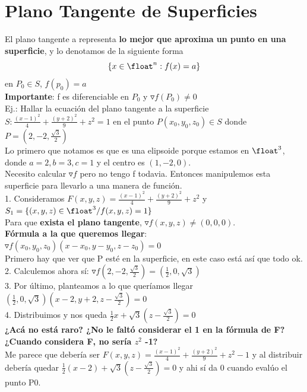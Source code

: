 \documentclass[10pt,a4paper]{article}
\begin{document}
\section*{Plano Tangente de Superficies}
El plano tangente a representa \textbf{lo mejor que aproxima un punto en una superficie}, y lo denotamos de la siguiente forma 
\[\{x \in \float^{n}:f(x) = a\}\]
en $P_{0} \in S$, $f(p_{0})=a$ \\
\textbf{Importante}: f es diferenciable en $P_{0}$ y $\triangledown f(P_{0}) \neq 0$ \\
Ej.: Hallar la ecuación del plano tangente a la superficie $S: \frac{(x-1)^{2}}{4} + \frac{(y+2)^{2}}{9} + z^{2} = 1$ en el punto $P(x_{0}, y_{0}, z_{0}) \in S$ donde $P=(2, -2, \frac{\sqrt{3}}{2})$ \\
Lo primero que notamos es que es una elipsoide porque estamos en $\float^{3}$, donde $ a = 2, b = 3, c = 1$ y el centro es $(1, -2, 0)$. \\
Necesito calcular $\triangledown f$ pero no tengo f todavia. Entonces manipulemos esta superficie para llevarlo a una manera de función. \\
1. Consideramos $F(x, y, z) = \frac{(x-1)^{2}}{4} + \frac{(y+2)^{2}}{9} + z^{2}$ y $S_{1} = \{(x,y,z) \in \float^{3} / f(x, y, z) = 1\}$ \\
Para que \textbf{exista el plano tangente}, $\triangledown f (x, y, z) \neq (0, 0, 0)$. \\
\textbf{Fórmula a la que queremos llegar}: $\triangledown f(x_{0}, y_{0}, z_{0})(x-x_{0}, y-y_{0}, z-z_{0}) = 0$ \\
Primero hay que ver que P esté en la superficie, en este caso está así que todo ok. \\
2. Calculemos ahora sí: $\triangledown f(2, -2, \frac{\sqrt{3}}{2}) = (\frac{1}{2}, 0, \sqrt{3})$ \\
3. Por último, planteamos a lo que queríamos llegar $(\frac{1}{2}, 0, \sqrt{3})(x-2, y+2, z-\frac{\sqrt{3}}{2}) = 0$ \\
4. Distribuimos y nos queda $\frac{1}{2}x + \sqrt{3}(z-\frac{\sqrt{3}}{2}) = 0$ \\
\textbf{¿Acá no está raro? ¿No le faltó considerar el 1 en la fórmula de F?} \\
\textbf{¿Cuando considera F, no sería $z^{2}$ -1?} \\
Me parece que debería ser $F(x, y, z) = \frac{(x-1)^{2}}{4} + \frac{(y+2)^{2}}{9} + z^{2} -1$ y al distribuir debería quedar $\frac{1}{2}(x-2) + \sqrt{3}(z-\frac{\sqrt{3}}{2}) = 0$ y ahi sí da 0 cuando evalúo el punto P0.
\end{document}
